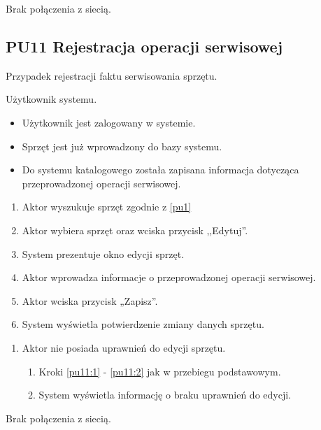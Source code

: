 Brak połączenia z siecią.

\subsection{PU11 Rejestracja operacji serwisowej} \label{pu11}
Przypadek rejestracji faktu serwisowania sprzętu.

Użytkownik systemu.

\begin{itemize}
\item Użytkownik jest zalogowany w systemie.
\item Sprzęt jest już wprowadzony do bazy systemu.
\end{itemize}

\begin{itemize}
\item Do systemu katalogowego została zapisana informacja dotycząca przeprowadzonej operacji serwisowej.
\end{itemize}

\begin{enumerate}
	\item \label{pu11:1} Aktor wyszukuje sprzęt zgodnie z \ref{pu1}
	\item \label{pu11:2} Aktor wybiera sprzęt oraz wciska przycisk ,,Edytuj''.
	\item System prezentuje okno edycji sprzęt.
	\item Aktor wprowadza informacje o przeprowadzonej operacji serwisowej.
	\item Aktor wciska przycisk „Zapisz”.
	\item System wyświetla potwierdzenie zmiany danych sprzętu.
\end{enumerate}

\begin{enumerate}
	\item Aktor nie posiada uprawnień do edycji sprzętu.
	\begin{enumerate}[label*=\arabic*.]
		\item Kroki \ref{pu11:1} - \ref{pu11:2} jak w przebiegu podstawowym.
		\item System wyświetla informację o braku uprawnień do edycji.
	\end{enumerate}
\end{enumerate}


Brak połączenia z siecią.